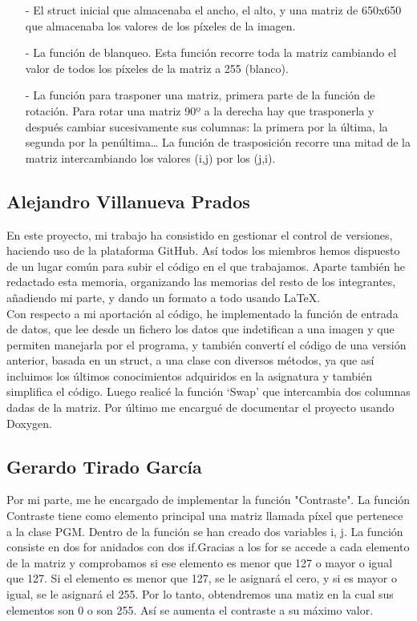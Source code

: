 \documentclass[a4paper, 11pt, spanish]{article}
\begin{document}
\begin{itemize}

\item[-] El struct inicial que almacenaba el ancho, el alto, y una matriz de 650x650 que almacenaba los valores de los píxeles de la imagen.

\item[-] La función de blanqueo. Esta función recorre toda la matriz cambiando el valor de todos los píxeles de la matriz a 255 (blanco).

\item[-] La función para trasponer una matriz, primera parte de la función de rotación. Para rotar una matriz 90º a la derecha hay que trasponerla y después cambiar sucesivamente sus columnas: la primera por la última, la segunda por la penúltima… La función de trasposición recorre una mitad de la matriz intercambiando los valores (i,j) por los (j,i).

\end{itemize}


\subsection{Alejandro Villanueva Prados}

En este proyecto, mi trabajo ha consistido en gestionar el control de versiones, haciendo uso de la plataforma GitHub. Así todos los miembros hemos dispuesto de un lugar común para subir el código en el que trabajamos. Aparte también he redactado esta memoria, organizando las memorias del resto de los integrantes, añadiendo mi parte, y dando un formato a todo usando \LaTeX.
\\

Con respecto a mi aportación al código, he implementado la función de entrada de datos, que lee desde un fichero los datos que indetifican a una imagen y que permiten manejarla por el programa, y también convertí el código de una versión anterior, basada en un struct, a una clase con diversos métodos, ya que así incluimos los últimos conocimientos adquiridos en la asignatura y también simplifica el código. Luego realicé la función `Swap' que intercambia dos columnas dadas de la matriz. Por último me encargué de documentar el proyecto usando Doxygen.


\subsection{Gerardo Tirado García}
Por mi parte, me he encargado de implementar la función  "Contraste". La función Contraste tiene como elemento principal una matriz llamada píxel que pertenece a la clase PGM. Dentro de la función se han creado dos variables i, j. La función consiste en dos for anidados con dos if.Gracias a los for se accede a cada elemento de la matriz y comprobamos si ese elemento es menor que 127 o mayor o igual que 127. Si el elemento es menor que 127, se le asignará el cero, y si es mayor o igual, se le asignará el 255. Por lo tanto, obtendremos una matiz en la cual sus elementos son 0 o son 255. Así se aumenta el contraste a su máximo valor.
\end{document}
